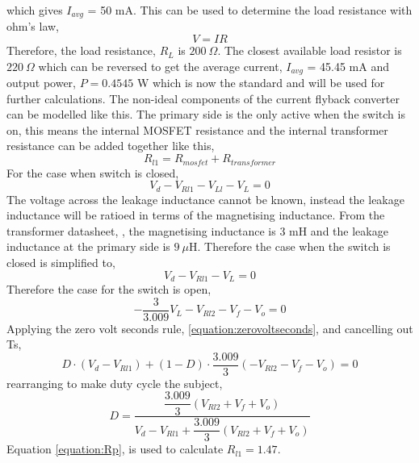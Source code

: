 \documentclass[12pt,twoside]{scrartcl}
\begin{document}
    which gives $I_{avg}$ = 50 mA. This can be used to determine the load resistance with ohm's law,
    \begin{equation}
        V = IR
        \label{equation:ohm}
    \end{equation}
    Therefore, the load resistance, $R_L$ is $200\: \Omega$. The closest available load resistor is $220\: \Omega$ which can be reversed to get the average current,
    $I_{avg}$ = 45.45 mA and output power, $P = 0.4545$ W which is now the standard and will be used for further calculations.
    The non-ideal components of the current flyback converter can be 
    modelled like this. The primary side is the only active when the 
    switch is on, this means the internal MOSFET resistance and the internal 
    transformer resistance can be added together like this,
    \begin{equation}
        R_{l1} = R_{mosfet} + R_{transformer}
        \label{equation:Rp}
    \end{equation}
    For the case when switch is closed,
    \begin{equation}
        V_d - V_{Rl1} - V_{Ll} - V_L = 0
    \end{equation}
    The voltage across the leakage inductance cannot be known, instead the 
    leakage inductance will be ratioed in terms of the magnetising inductance. From the transformer datasheet, \cite{RN2}, the magnetising 
    inductance is $3$ mH and the leakage inductance at the primary side is $9\:\mu$H. Therefore the case when
    the switch is closed is simplified to,
    \begin{equation}
        V_d - V_{Rl1} - V_L = 0
    \end{equation}
    Therefore the case for the switch is open,
    \begin{equation}
        -\dfrac{3}{3.009}V_L - V_{Rl2} - V_f - V_o = 0
    \end{equation}
    Applying the zero volt seconds rule, \ref{equation:zerovoltseconds}, and cancelling out Ts,
    \begin{equation}
        D \cdot( V_d - V_{Rl1} ) + (1-D) \cdot \dfrac{3.009}{3}(- V_{Rl2} - V_f - V_o) = 0
    \end{equation}
    rearranging to make duty cycle the subject,
    \begin{equation}
        D  = \frac{\dfrac{3.009}{3}(V_{Rl2} + V_f + V_o)}{V_d - V_{Rl1} + \dfrac{3.009}{3}(V_{Rl2} + V_f + V_o)}
    \end{equation}
    Equation \ref{equation:Rp}, is used to calculate $R_{l1} = 1.47$. 
\end{document}
